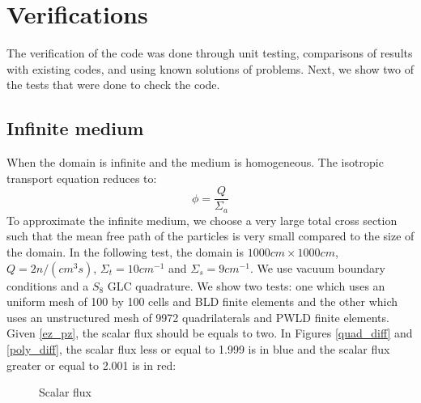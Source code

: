 \section{Verifications}
The verification of the code was done through unit testing, comparisons of
results with existing codes, and using known solutions of problems. Next, we
show two of the tests that were done to check the code.
\subsection{Infinite medium}
When the domain is infinite and the medium is homogeneous. The isotropic
transport equation reduces to:
\begin{equation}
  \phi = \frac{Q}{\Sigma_a}
  \label{ez_pz}
\end{equation}
To approximate the infinite medium, we choose a very large total cross section
such that the mean free path of the particles is very small compared to the
size of the domain. In the following test, the domain is $1000cm \times
1000cm$, $Q = 2 n/(cm^3s)$, $\Sigma_t = 10 cm^{-1}$ and $\Sigma_s = 9
cm^{-1}$. We use vacuum boundary conditions and a $S_{8}$ GLC quadrature.
We show two tests: one which uses an uniform mesh of 100 by 100 cells and BLD
finite elements and the other which uses an unstructured mesh of 9972
quadrilaterals and PWLD finite elements. Given \cref{ez_pz}, the scalar flux
should be equals to two. In Figures \ref{quad_diff} and \ref{poly_diff}, the 
scalar flux less or equal to 1.999 is in blue and the scalar flux greater or 
equal to 2.001 is in red:
\begin{figure}[H]
  \centering
  \caption{Scalar flux}
\end{figure}

